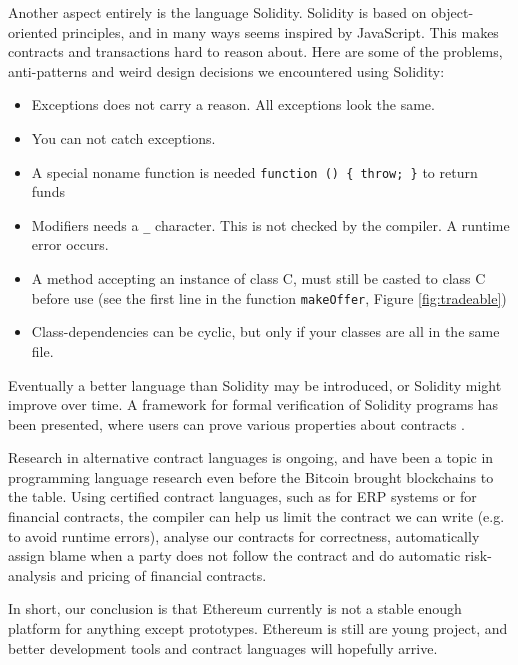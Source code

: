 \documentclass[oneside,a4paper,10pts,article]{memoir}
\begin{document}
Another aspect entirely is the language Solidity. Solidity is based on
object-oriented principles, and in many ways seems inspired by
JavaScript. This makes contracts and transactions hard to reason
about. Here are some of the problems, anti-patterns and weird design
decisions we encountered using Solidity:
\begin{itemize}
\item Exceptions does not carry a reason. All exceptions look the same.
\item You can not catch exceptions.
\item A special noname function is needed \texttt{function () \{ throw; \}} to return funds
\item Modifiers needs a \texttt{\_} character. This is not checked by
  the compiler. A runtime error occurs.
\item A method accepting an instance of class C, must still be casted
  to class C before use (see the first line in the function
  \texttt{makeOffer}, Figure \ref{fig:tradeable})
\item Class-dependencies can be cyclic, but only if your classes are
  all in the same file.
\end{itemize}

Eventually a better language than Solidity may be introduced, or
Solidity might improve over time. A framework for formal verification
of Solidity programs has been presented, where users can prove various
properties about contracts \cite{bhargavanshort}. 

Research in alternative contract languages is ongoing, and have been a
topic in programming language research even before the Bitcoin brought
blockchains to the table. Using certified contract languages, such as
\cite{hvitved2011contract} for ERP systems or \cite{bahr2015certified}
for financial contracts, the compiler can help us limit the contract
we can write (e.g. to avoid runtime errors), analyse our contracts for
correctness, automatically assign blame when a party does not follow
the contract and do automatic risk-analysis and pricing of financial
contracts.

In short, our conclusion is that Ethereum currently is not a stable
enough platform for anything except prototypes. Ethereum is still are
young project, and better development tools and contract languages
will hopefully arrive.

\end{document}
